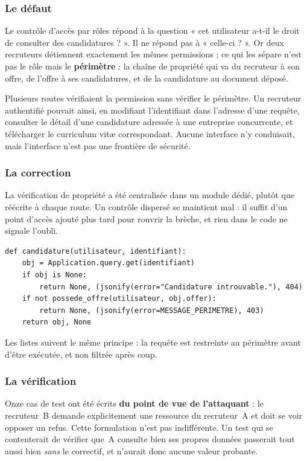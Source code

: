 \documentclass[11pt,a4paper]{article}
\begin{document}
\subsubsection{Le défaut}
Le contrôle d'accès par rôles répond à la question « cet utilisateur a-t-il le droit de consulter des candidatures ? ». Il ne répond pas à « celle-ci ? ». Or deux recruteurs détiennent exactement les mêmes permissions ; ce qui les sépare n'est pas le rôle mais le \textbf{périmètre} : la chaîne de propriété qui va du recruteur à son offre, de l'offre à ses candidatures, et de la candidature au document déposé.

Plusieurs routes vérifiaient la permission sans vérifier le périmètre. Un recruteur authentifié pouvait ainsi, en modifiant l'identifiant dans l'adresse d'une requête, consulter le détail d'une candidature adressée à une entreprise concurrente, et télécharger le curriculum vitæ correspondant. Aucune interface n'y conduisait, mais l'interface n'est pas une frontière de sécurité.

\subsubsection{La correction}
La vérification de propriété a été centralisée dans un module dédié, plutôt que réécrite à chaque route. Un contrôle dispersé se maintient mal : il suffit d'un point d'accès ajouté plus tard pour rouvrir la brèche, et rien dans le code ne signale l'oubli.

\begin{lstlisting}[caption={Résolution d'une ressource avec vérification du périmètre. La fonction rend un couple : la ressource si l'accès est légitime, sinon la réponse de refus déjà formée.}]
def candidature(utilisateur, identifiant):
    obj = Application.query.get(identifiant)
    if obj is None:
        return None, (jsonify(error="Candidature introuvable."), 404)
    if not possede_offre(utilisateur, obj.offer):
        return None, (jsonify(error=MESSAGE_PERIMETRE), 403)
    return obj, None
\end{lstlisting}

\noindent Les listes suivent le même principe : la requête est restreinte au périmètre avant d'être exécutée, et non filtrée après coup.

\subsubsection{La vérification}
Onze cas de test ont été écrits \textbf{du point de vue de l'attaquant} : le recruteur~B demande explicitement une ressource du recruteur~A et doit se voir opposer un refus. Cette formulation n'est pas indifférente. Un test qui se contenterait de vérifier que~A consulte bien ses propres données passerait tout aussi bien \emph{sans} le correctif, et n'aurait donc aucune valeur probante.
\end{document}

